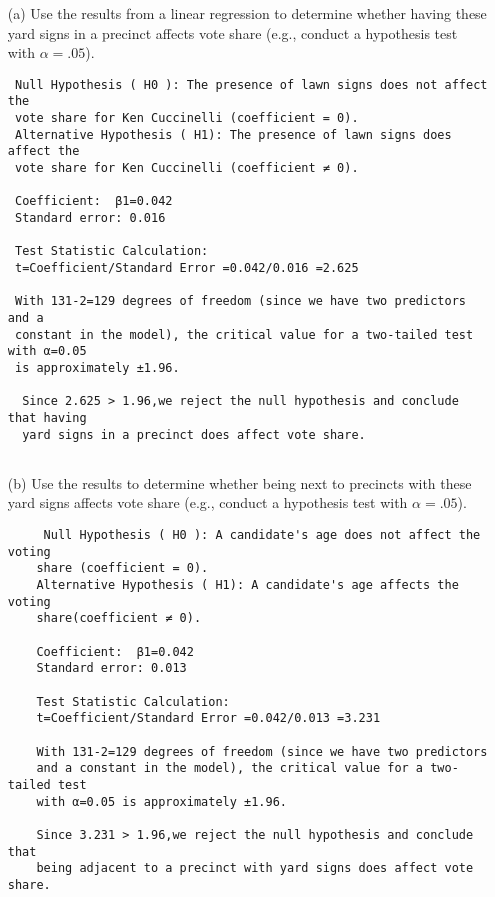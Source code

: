\documentclass[12pt,letterpaper]{article}
\begin{document}
\vspace{.5cm}
\begin{enumerate}
	\item [(a)] Use the results from a linear regression to determine whether having these yard signs in a precinct affects vote share (e.g., conduct a hypothesis test with $\alpha = .05$).
		\begin{verbatim}
 Null Hypothesis ( H0 ): The presence of lawn signs does not affect the
 vote share for Ken Cuccinelli (coefficient = 0).
 Alternative Hypothesis ( H1): The presence of lawn signs does affect the
 vote share for Ken Cuccinelli (coefficient ≠ 0).
	 
 Coefficient:  β1=0.042
 Standard error: 0.016
     
 Test Statistic Calculation:
 t=Coefficient/Standard Error =0.042/0.016 =2.625
     
 With 131-2=129 degrees of freedom (since we have two predictors and a
 constant in the model), the critical value for a two-tailed test with α=0.05
 is approximately ±1.96.
     
  Since 2.625 > 1.96,we reject the null hypothesis and conclude that having
  yard signs in a precinct does affect vote share.
     
\end{verbatim}
	
	\item [(b)]  Use the results to determine whether being
	next to precincts with these yard signs affects vote
	share (e.g., conduct a hypothesis test with $\alpha = .05$).
	\begin{verbatim}
	 Null Hypothesis ( H0 ): A candidate's age does not affect the voting
	share (coefficient = 0).
	Alternative Hypothesis ( H1): A candidate's age affects the voting
	share(coefficient ≠ 0).
		
	Coefficient:  β1=0.042
	Standard error: 0.013
		
	Test Statistic Calculation:
	t=Coefficient/Standard Error =0.042/0.013 =3.231
		
	With 131-2=129 degrees of freedom (since we have two predictors
	and a constant in the model), the critical value for a two-tailed test
	with α=0.05 is approximately ±1.96.
		
	Since 3.231 > 1.96,we reject the null hypothesis and conclude that
	being adjacent to a precinct with yard signs does affect vote share.
	   
\end{verbatim}


\end{enumerate}
\end{document}
